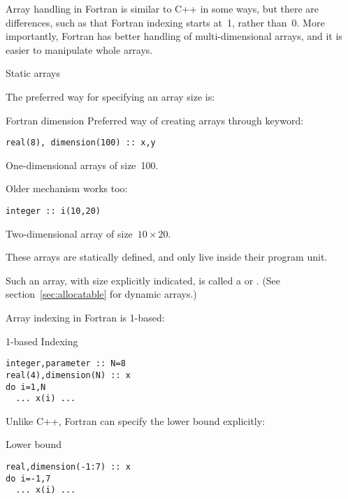 
Array handling in Fortran is similar to C++ in some ways, but there
are differences, such as that  Fortran indexing starts at~1, rather
than~0. More importantly, Fortran has better handling of
multi-dimensional arrays, and it is easier to manipulate whole arrays.

 {Static arrays}

The preferred way for specifying an array size is:

\begin{block}{Fortran dimension}
  \label{sl:farray-dimension}
Preferred way of creating arrays through 
keyword:
\begin{verbatim}
real(8), dimension(100) :: x,y
\end{verbatim}
One-dimensional arrays of size~100.

Older mechanism works too:
\begin{verbatim}
integer :: i(10,20)
\end{verbatim}
Two-dimensional array of size~$10\times 20$.

These arrays are statically defined, and only live inside their
program unit.
\end{block}

Such an array, with size explicitly indicated, is called a
 or .
(See section~\ref{sec:allocatable} for
dynamic arrays.)

Array indexing in Fortran is 1-based:
\begin{block}{1-based Indexing}
  \label{sl:farray-base1}
\begin{verbatim}
integer,parameter :: N=8
real(4),dimension(N) :: x
do i=1,N
  ... x(i) ...
\end{verbatim}
\end{block}

Unlike C++, Fortran can specify the lower bound explicitly:
\begin{block}{Lower bound}
  \label{sl:farray-lower}
\begin{verbatim}
real,dimension(-1:7) :: x
do i=-1,7
  ... x(i) ...
\end{verbatim}
\end{block}

